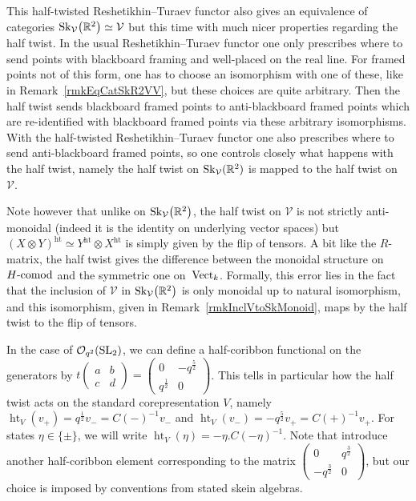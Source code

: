 \documentclass[pdftex]{sigma}%
\numberwithin{equation}{section}
\newcommand{\halft}{{\operatorname{ht}}}
\newcommand{\Oq}{\mathcal{O}_{q^2}({\rm SL}_2)}
\begin{document}
\begin{Remark}
This half-twisted Reshetikhin--Turaev functor also gives an equivalence of categories ${\rm Sk}_\mathcal{V}\big(\mathbb{R}^2\big) \simeq \mathcal{V}$ but this time with much nicer properties regarding the half twist. In the usual Reshetikhin--Turaev functor one only prescribes where to send points with blackboard framing and well-placed on the real line. For framed points not of this form, one has to choose an isomorphism with one of these, like in Remark~\ref{rmkEqCatSkR2VV}, but these choices are quite arbitrary. Then the half twist sends blackboard framed points to anti-blackboard framed points which are re-identified with blackboard framed points via these arbitrary isomorphisms. With the half-twisted Reshetikhin--Turaev functor one also prescribes where to send anti-blackboard framed points, so one controls closely what happens with the half twist, namely the half twist on ${\rm Sk}_\mathcal{V}(\mathbb{R}^2)$ is mapped to the half twist on~$\mathcal{V}$.

Note however that unlike on ${\rm Sk}_\mathcal{V}\big(\mathbb{R}^2\big)$, the half twist on $\mathcal{V}$ is not strictly anti-monoidal (indeed it is the identity on underlying vector spaces) but $(X\otimes Y)^\halft \simeq Y^\halft \otimes X^\halft$ is simply given by the flip of tensors. A bit like the $R$-matrix, the half twist gives the difference between the monoidal structure on $H\text{-}{\rm comod}$ and the symmetric one on~${\rm Vect}_k$. Formally, this error lies in the fact that the inclusion of $\mathcal{V}$ in ${\rm Sk}_\mathcal{V}\big(\mathbb{R}^2\big)$ is only monoidal up to natural isomorphism, and this isomorphism, given in Remark~\ref{rmkInclVtoSkMonoid}, maps by the half twist to the flip of tensors.
\end{Remark}

In the case of $\Oq$, we can define a half-coribbon functional on the generators by $t \left( \begin{smallmatrix} a & b \\ c & d \end{smallmatrix} \right) = \left( \begin{smallmatrix} 0 & -q^{\frac{5}{2}} \\ q^{\frac{1}{2}} & 0 \end{smallmatrix}\right)$. This tells in particular how the half twist acts on the standard corepresentation $V$, namely $\halft_V(v_+) = q^{\frac{1}{2}} v_- = C(-)^{-1} v_-$ and $\halft_V(v_-) = -q^{\frac{5}{2}} v_+ = C(+)^{-1} v_+$. For states $\eta \in \{\pm\}$, we will write $\halft_V(\eta) = -\eta .C(-\eta)^{-1}$.
Note that \cite{SnyderTingley} introduce another half-coribbon element corresponding to the matrix $\left( \begin{smallmatrix} 0 & q^{\frac{3}{2}} \\ -q^{\frac{3}{2}} & 0 \end{smallmatrix} \right)$, but our choice is imposed by conventions from stated skein algebras.
\end{document}
